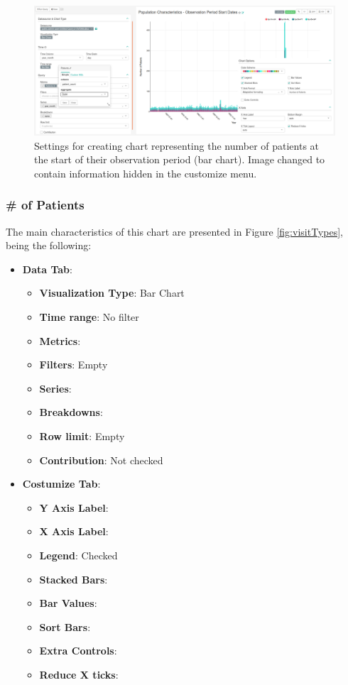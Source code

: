 \documentclass[
]{book}
\providecommand{\tightlist}{%
  \setlength{\itemsep}{0pt}\setlength{\parskip}{0pt}}
\begin{document}
\begin{figure}
\includegraphics[width=1\linewidth]{images/populationCharacteristicsObservationPeriodStartDates} \caption{Settings for creating chart representing the number of patients at the start of their observation period (bar chart). Image changed to contain information hidden in the customize menu.}\label{fig:visitTypes4}
\end{figure}

\hypertarget{of-patients}{%
\subsubsection{\# of Patients}\label{of-patients}}

The main characteristics of this chart are presented in Figure \ref{fig:visitTypes}, being the following:

\begin{itemize}
\tightlist
\item
  \textbf{Data Tab}:

  \begin{itemize}
  \tightlist
  \item
    \textbf{Visualization Type}: Bar Chart
  \item
    \textbf{Time range}: No filter
  \item
    \textbf{Metrics}:
  \item
    \textbf{Filters}: Empty
  \item
    \textbf{Series}:
  \item
    \textbf{Breakdowns}:
  \item
    \textbf{Row limit}: Empty
  \item
    \textbf{Contribution}: Not checked
  \end{itemize}
\item
  \textbf{Costumize Tab}:

  \begin{itemize}
  \tightlist
  \item
    \textbf{Y Axis Label}:
  \item
    \textbf{X Axis Label}:
  \item
    \textbf{Legend}: Checked
  \item
    \textbf{Stacked Bars}:
  \item
    \textbf{Bar Values}:
  \item
    \textbf{Sort Bars}:
  \item
    \textbf{Extra Controls}:
  \item
    \textbf{Reduce X ticks}:
  \end{itemize}
\end{itemize}
\end{document}
